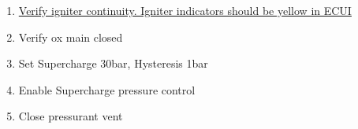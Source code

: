 \begin{enumerate}[label=L\arabic*.]
{\begin{itemize}
        \item Open Ox bottle\leftcheckbox
        \item Open Pressurant bottle\leftcheckbox
        \item Read out pressurant bottle pressure and forward to\newline Mission Lead.\leftcheckbox
        \item Start flight on TRS\leftcheckbox
        \item Remove RBF zip tie \leftcheckbox
        \item Remove RBF umbilical locking device \leftcheckbox
        \item Pull RBF pin\leftcheckbox
        \item Report Final preps complete to Mission Lead.\leftcheckbox
        \item Vacate pad\leftcheckbox
    \end{itemize}}
    

    \item \underline{Verify igniter continuity. Igniter indicators should be yellow in ECUI} \checkbox
    
    \item Verify ox main closed\checkbox    
    \item Set Supercharge 30bar, Hysteresis 1bar\checkbox    
    \item Enable Supercharge pressure control\checkbox    
    \item Close pressurant vent\checkbox
    

\end{enumerate}

